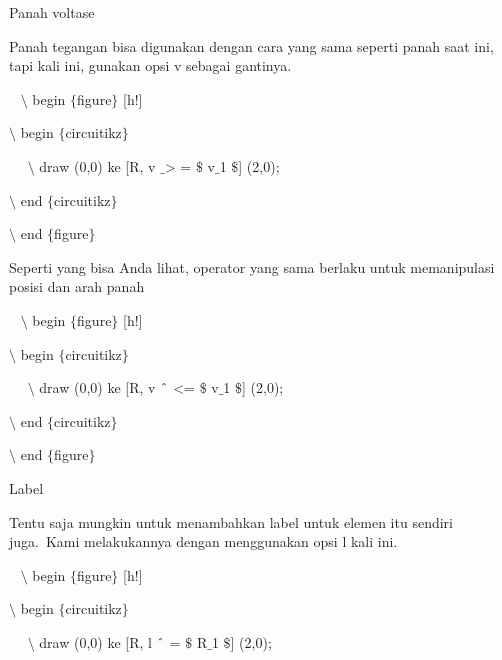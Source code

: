 \noindent 
Panah voltase
\par


\noindent 
Panah tegangan bisa digunakan dengan cara yang sama seperti panah saat ini, tapi kali ini, gunakan opsi v sebagai gantinya.
\par


\noindent 
~ $\setminus$ begin $ \{ $figure$ \} $ [h!]
\par


\noindent 
 $\setminus$ begin $ \{ $circuitikz$ \} $
\par


\noindent 
~~ $\setminus$ draw (0,0) ke [R, v $ \_ $> = $\$$ v$ \_ $1 $\$$] (2,0);
\par


\noindent 
 $\setminus$ end $ \{ $circuitikz$ \} $
\par


\noindent 
 $\setminus$ end $ \{ $figure$ \} $ 
\par


\noindent 
Seperti yang bisa Anda lihat, operator yang sama berlaku untuk memanipulasi posisi dan arah panah
\par


\noindent 
~ $\setminus$ begin $ \{ $figure$ \} $ [h!]
\par


\noindent 
 $\setminus$ begin $ \{ $circuitikz$ \} $
\par


\noindent 
~~ $\setminus$ draw (0,0) ke [R, v $ \string^ $ <= $\$$ v$ \_ $1 $\$$] (2,0);
\par


\noindent 
 $\setminus$ end $ \{ $circuitikz$ \} $
\par


\noindent 
 $\setminus$ end $ \{ $figure$ \} $ 
\par


\noindent 
Label
\par


\noindent 
Tentu saja mungkin untuk menambahkan label untuk elemen itu sendiri juga. Kami melakukannya dengan menggunakan opsi l kali ini.
\par


\noindent 
~ $\setminus$ begin $ \{ $figure$ \} $ [h!]
\par


\noindent 
 $\setminus$ begin $ \{ $circuitikz$ \} $
\par


\noindent 
~~ $\setminus$ draw (0,0) ke [R, l $ \string^ $ = $\$$ R$ \_ $1 $\$$] (2,0);
\par


